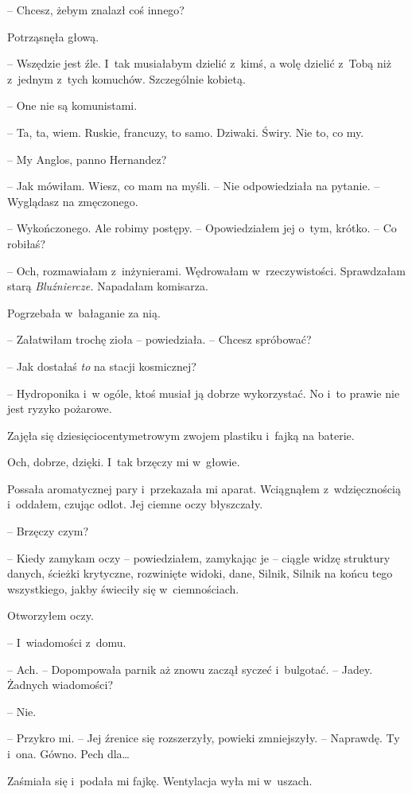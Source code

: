 \documentclass[oneside,polish,12pt,sfheadings]{mwbk}
\begin{document}
-- Chcesz, żebym znalazł coś innego?

Potrząsnęła głową. 

-- Wszędzie jest źle. I~tak musiałabym dzielić z~kimś,
a wolę dzielić z~Tobą niż z~jednym z~tych komuchów. Szczególnie kobietą.

-- One nie są komunistami.

-- Ta, ta, wiem. Ruskie, francuzy, to samo. Dziwaki. Świry. Nie to, co
my.

-- My Anglos, panno Hernandez?

-- Jak mówiłam. Wiesz, co mam na myśli. -- Nie odpowiedziała na pytanie. --
Wyglądasz na zmęczonego.

-- Wykończonego. Ale robimy postępy. -- Opowiedziałem jej o~tym, krótko. --
Co robiłaś?

-- Och, rozmawiałam z~inżynierami. Wędrowałam w~rzeczywistości.
Sprawdzałam starą \emph{Bluźniercze. } Napadałam komisarza.

Pogrzebała w~bałaganie za nią.

-- Załatwiłam trochę zioła -- powiedziała. -- Chcesz spróbować?

-- Jak dostałaś \emph{to} na stacji kosmicznej?

-- Hydroponika i~w ogóle, ktoś musiał ją dobrze wykorzystać. No i~to
prawie nie jest ryzyko pożarowe.

Zajęła się dziesięciocentymetrowym zwojem plastiku i~fajką na baterie.

Och, dobrze, dzięki. I~tak brzęczy mi w~głowie.

Possała aromatycznej pary i~przekazała mi aparat. Wciągnąłem z~wdzięcznością i~oddałem, czując odlot. Jej ciemne oczy błyszczały.

-- Brzęczy czym?

-- Kiedy zamykam oczy -- powiedziałem, zamykając je -- ciągle widzę
struktury danych, ścieżki krytyczne, rozwinięte widoki, dane, Silnik,
Silnik na końcu tego wszystkiego, jakby świeciły się w~ciemnościach.

Otworzyłem oczy. 

-- I~wiadomości z~domu.

-- Ach. -- Dopompowała parnik aż znowu zaczął syczeć i~bulgotać. -- Jadey.
Żadnych wiadomości?

-- Nie.

-- Przykro mi. -- Jej źrenice się rozszerzyły, powieki zmniejszyły. -- Naprawdę. Ty i~ona. Gówno. Pech dla\ldots

Zaśmiała się i~podała mi fajkę. Wentylacja wyła mi w~uszach.
\end{document}
